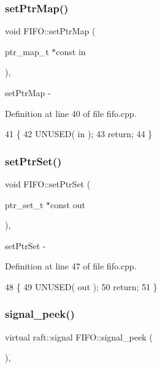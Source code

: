 \subsubsection{\texorpdfstring{set\+Ptr\+Map()}{setPtrMap()}}
{\footnotesize\ttfamily void F\+I\+F\+O\+::set\+Ptr\+Map (\begin{DoxyParamCaption}\item[{ptr\+\_\+map\+\_\+t $\ast$const}]{in }\end{DoxyParamCaption})\hspace{0.3cm}{\ttfamily [protected]}, {\ttfamily [virtual]}}

set\+Ptr\+Map -\/ 

Definition at line 40 of file fifo.\+cpp.


\begin{DoxyCode}
41 \{
42     UNUSED( in );
43     \textcolor{keywordflow}{return};
44 \}
\end{DoxyCode}
\hypertarget{class_f_i_f_o_a866988c11d53fae77d6ac6f0b56aae56}{}\label{class_f_i_f_o_a866988c11d53fae77d6ac6f0b56aae56} 
\subsubsection{\texorpdfstring{set\+Ptr\+Set()}{setPtrSet()}}
{\footnotesize\ttfamily void F\+I\+F\+O\+::set\+Ptr\+Set (\begin{DoxyParamCaption}\item[{ptr\+\_\+set\+\_\+t $\ast$const}]{out }\end{DoxyParamCaption})\hspace{0.3cm}{\ttfamily [protected]}, {\ttfamily [virtual]}}

set\+Ptr\+Set -\/ 

Definition at line 47 of file fifo.\+cpp.


\begin{DoxyCode}
48 \{
49     UNUSED( out );
50     \textcolor{keywordflow}{return};
51 \}
\end{DoxyCode}
\hypertarget{class_f_i_f_o_a36a7519af834c969d49f3d9ae7080af9}{}\label{class_f_i_f_o_a36a7519af834c969d49f3d9ae7080af9} 
\subsubsection{\texorpdfstring{signal\+\_\+peek()}{signal\_peek()}}
{\footnotesize\ttfamily virtual raft\+::signal F\+I\+F\+O\+::signal\+\_\+peek (\begin{DoxyParamCaption}{ }\end{DoxyParamCaption})\hspace{0.3cm}{\ttfamily [protected]}, {}}


